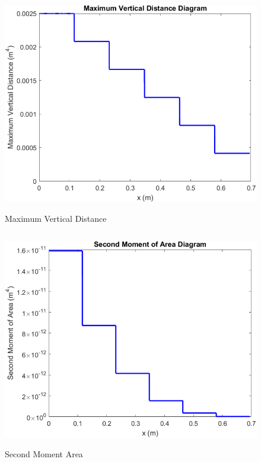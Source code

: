 \documentclass[12pt]{article}
\begin{document}
\begin{figure}[H]
\centering
\includegraphics[height= 9.5cm, width= 12.5cm]{Max_Vertical_Distance.png}
\caption{Maximum Vertical Distance}
\label{MaximumVerticalDistance}
\end{figure}

\begin{figure}[H]
\centering
\includegraphics[height= 9.5cm, width= 12.5cm]{Second_Moment_of_Area.png}
\caption{Second Moment Area}
\label{SecondMomentArea}
\end{figure}
\end{document}
